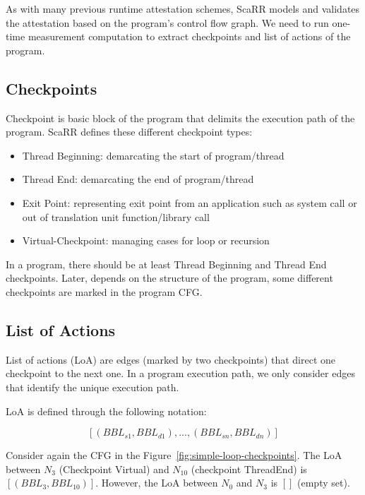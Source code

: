 As with many previous runtime attestation schemes, ScaRR models and validates
the attestation based on the program's control flow graph. We need to run
one-time measurement computation to extract checkpoints and list of actions of
the program.

\subsection{Checkpoints} \label{sec:scarr-checkpoints} Checkpoint is basic block
of the program that delimits the execution path of the program. ScaRR defines
these different checkpoint types:
\begin{itemize}
    \item Thread Beginning: demarcating the start of program/thread
    \item Thread End: demarcating the end of program/thread
    \item Exit Point: representing exit point from an application such as system
    call or out of translation unit function/library call
    \item Virtual-Checkpoint: managing cases for loop or recursion
\end{itemize}

In a program, there should be at least Thread Beginning and Thread End
checkpoints. Later, depends on the structure of the program, some different
checkpoints are marked in the program CFG.

\subsection{List of Actions}

List of actions (LoA) are edges (marked by two checkpoints) that direct one
checkpoint to the next one. In a program execution path, we only consider edges
that identify the unique execution path.

LoA is defined through the following notation:


$$[(BBL_{s1},BBL_{d1}),...,(BBL_{sn},BBL_{dn})]$$

Consider again the CFG in the Figure~\ref{fig:simple-loop-checkpoints}. The LoA
between $N_3$ (Checkpoint Virtual) and $N_{10}$ (checkpoint ThreadEnd) is
$[(BBL_3, BBL_{10})]$. However, the LoA between $N_0$ and $N_3$ is $[]$ (empty
set).


